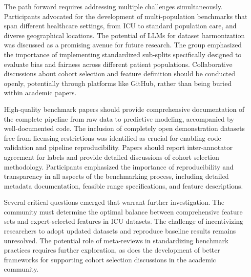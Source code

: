 The path forward requires addressing multiple challenges simultaneously. Participants advocated for the development of multi-population benchmarks that span different healthcare settings, from ICU to standard population care, and diverse geographical locations. The potential of LLMs for dataset harmonization was discussed as a promising avenue for future research. The group emphasized the importance of implementing standardized sub-splits specifically designed to evaluate bias and fairness across different patient populations. Collaborative discussions about cohort selection and feature definition should be conducted openly, potentially through platforms like GitHub, rather than being buried within academic papers.

High-quality benchmark papers should provide comprehensive documentation of the complete pipeline from raw data to predictive modeling, accompanied by well-documented code. The inclusion of completely open demonstration datasets free from licensing restrictions was identified as crucial for enabling code validation and pipeline reproducibility. Papers should report inter-annotator agreement for labels and provide detailed discussions of cohort selection methodology. Participants emphasized the importance of reproducibility and transparency in all aspects of the benchmarking process, including detailed metadata documentation, feasible range specifications, and feature descriptions.

Several critical questions emerged that warrant further investigation. The community must determine the optimal balance between comprehensive feature sets and expert-selected features in ICU datasets. The challenge of incentivizing researchers to adopt updated datasets and reproduce baseline results remains unresolved. The potential role of meta-reviews in standardizing benchmark practices requires further exploration, as does the development of better frameworks for supporting cohort selection discussions in the academic community.


